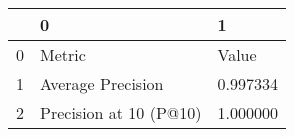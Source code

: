 \begin{tabular}{lll}
\toprule
 & 0 & 1 \\
\midrule
0 & Metric & Value \\
1 & Average Precision & 0.997334 \\
2 & Precision at 10 (P@10) & 1.000000 \\
\bottomrule
\end{tabular}
